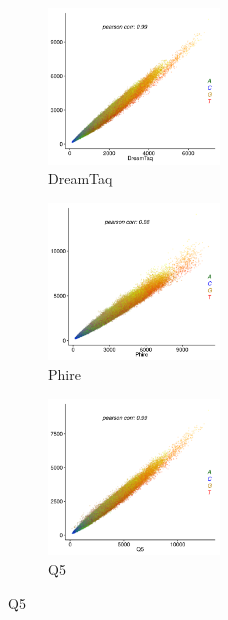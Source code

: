 \documentclass[parskip=full, numbers=noenddot]{scrreprt}
\begin{document}
\begin{figure}[htpb]
  \centering
  \begin{subfigure}[htpb]{0.5\textwidth}
    \centering
    \includegraphics[width=0.5\textwidth]{kmer_dreamtaq}
    \caption{DreamTaq}
    \label{fig:kmer_enz_dreamtaq}
  \end{subfigure}
  \begin{subfigure}[htpb]{0.5\textwidth}
    \centering
    \includegraphics[width=0.5\textwidth]{kmer_phire}
    \caption{Phire}
    \label{fig:kmer_enz_phire}
  \end{subfigure}
  \begin{subfigure}[htpb]{0.5\textwidth}
    \centering
    \includegraphics[width=0.5\textwidth]{kmer_q5}
    \caption{Q5}
    \label{fig:kmer_enz_q5}
  \end{subfigure}

\end{figure}
\end{document}
